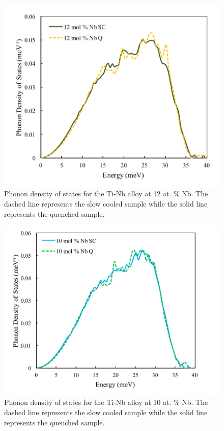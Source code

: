 \pagebreak
\begin{figure}[H]
	\centering
	\includegraphics[width=\textwidth]{Chapter-7/Figures/50dos12.png}
	\caption{Phonon density of states for the Ti-Nb alloy at 12 at. \% Nb. The dashed line represents the slow cooled sample while the solid line represents the quenched sample.}
	\label{Ch7-figure:50dos12}
\end{figure}

\pagebreak
\begin{figure}[H]
	\centering
	\includegraphics[width=\textwidth]{Chapter-7/Figures/50dos10.png}
	\caption{Phonon density of states for the Ti-Nb alloy at 10 at. \% Nb. The dashed line represents the slow cooled sample while the solid line represents the quenched sample.}
	\label{Ch7-figure:50dos10}
\end{figure}


